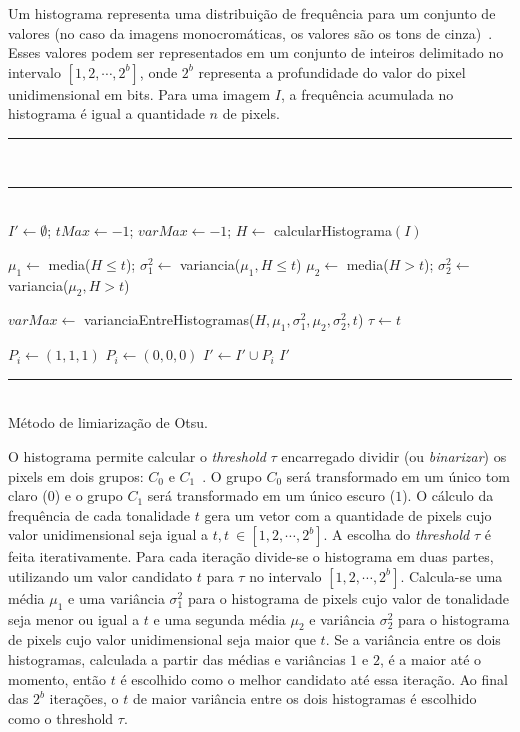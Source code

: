 Um histograma representa uma distribuição de frequência para um conjunto de valores (no caso da imagens monocromáticas, os valores são os tons de cinza)~\cite{Kapur1985}. 
Esses valores podem ser representados em um conjunto de inteiros delimitado no intervalo $[1, 2, \cdots, 2^b]$, onde $2^b$ representa a profundidade do valor do pixel unidimensional em bits.
Para uma imagem $I$, a frequência acumulada no histograma é igual a quantidade $n$ de pixels.

\begin{algorithm} [!b]
\nonl \rule[0.5ex]{410px}{0.5pt}\\



\nonl \rule[0.5ex]{410px}{0.5pt}\\
$I' \leftarrow \emptyset$;
$tMax \leftarrow -1$;
$varMax \leftarrow -1$; $H \leftarrow$ calcularHistograma$(I)$ \;

  {
    $\mu_1 \leftarrow$ media($H \leq t$);
    $\sigma^2_1 \leftarrow$ variancia($\mu_1, H \leq t$)\;
    $\mu_2 \leftarrow$ media($H > t$);
    $\sigma^2_2 \leftarrow$ variancia($\mu_2, H > t$)\;

     {
        $varMax \leftarrow$ varianciaEntreHistogramas($H, \mu_1, \sigma^2_1, \mu_2, \sigma^2_2, t$)\;
        $\tau \leftarrow t$ \;
    }
}
 {
             { 
                $P_i \leftarrow (1,1,1)$
            } { $P_i \leftarrow (0,0,0)$  }
            $I' \leftarrow I' \cup P_i$\;
}
\Return $I'$\;
\nonl \rule[0.5ex]{410px}{0.5pt}\\
\caption{Método de limiarização de Otsu.}\label{alg:otsu}
\end{algorithm}

O histograma permite calcular o \textit{threshold} $\tau$ encarregado dividir (ou \textit{binarizar}) os pixels em dois grupos: $C_0$ e $C_1$~\cite{Sheng2005}.
O grupo $C_0$ será transformado em um único tom claro ($0$) e o grupo $C_1$ será transformado em um único escuro ($1$).
O cálculo da frequência de cada tonalidade $t$ gera um vetor com a quantidade de pixels cujo valor unidimensional seja igual a $t, t~\in [1, 2, \cdots, 2^b]$.
A escolha do \textit{threshold} $\tau$ é feita iterativamente.
Para cada iteração divide-se o histograma em duas partes, utilizando um valor candidato $t$ para $\tau$ no intervalo $[1, 2, \cdots, 2^b]$.
Calcula-se uma média $\mu_1$ e uma variância $\sigma^2_1$ para o histograma de pixels cujo valor de tonalidade seja menor ou igual a $t$ e uma segunda média $\mu_2$ e variância $\sigma^2_2$ para o histograma de pixels cujo valor unidimensional seja maior que $t$.
Se a variância entre os dois histogramas, calculada a partir das médias e variâncias $1$ e $2$, é a maior até o momento, então $t$ é escolhido como o melhor candidato até essa iteração.
Ao final das $2^b$ iterações, o $t$ de maior variância entre os dois histogramas é escolhido como o threshold $\tau$.

